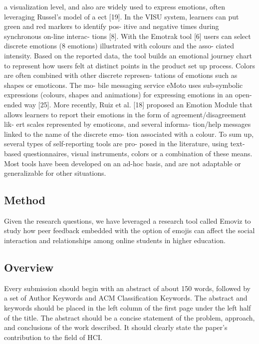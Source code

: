 \documentclass[chi_draft]{sigchi}
\begin{document}
a visualization level, and also are widely used to express emotions, often leveraging Russel's model of a ect [19]. In the VISU system, learners can put green and red markers to identify pos- itive and negative times during synchronous on-line interac- tions [8]. With the Emotrak tool [6] users can select discrete emotions (8 emotions) illustrated with colours and the asso- ciated intensity. Based on the reported data, the tool builds an emotional journey chart to represent how users felt at distinct points in the product set up process. Colors are often combined with other discrete represen- tations of emotions such as shapes or emoticons. The mo- bile messaging service eMoto uses sub-symbolic expressions (colours, shapes and animations) for expressing emotions in an open-ended way [25]. More recently, Ruiz et al. [18] proposed an Emotion Module that allows learners to report their emotions in the form of agreement/disagreement lik- ert scales represented by emoticons, and several informa- tion/help messages linked to the name of the discrete emo- tion associated with a colour. To sum up, several types of self-reporting tools are pro- posed in the literature, using text-based questionnaires, visual instruments, colors or a combination of these means. Most tools have been developed on an ad-hoc basis, and are not adaptable or generalizable for other situations.

\subsection{Method}

Given the research questions, we have leveraged a research tool called Emoviz to study how peer feedback embedded with the option of emojis can affect the social interaction and relationships among online students in higher education. 

\subsection{Overview}

Every submission should begin with an abstract of about 150 words,
followed by a set of Author Keywords and ACM Classification
Keywords. The abstract and keywords should be placed in the left
column of the first page under the left half of the title. The
abstract should be a concise statement of the problem, approach, and
conclusions of the work described. It should clearly state the paper's
contribution to the field of HCI\@.
\end{document}
